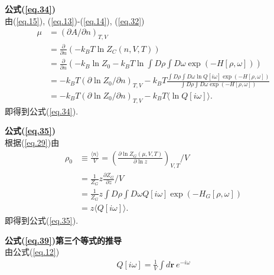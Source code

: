\textbf{公式(\ref{eq.34})}
\\
由(\ref{eq.15}), (\ref{eq.13})-(\ref{eq.14}), (\ref{eq.32})
 \begin{equation}
       \begin{aligned}
           \mu&=(\partial A/\partial n)_{T, V}
              \\
              &=\frac{\partial}{\partial n}(-k_{B}T \ln Z_{C}(n, V, T))
              \\
              &=\frac{\partial}{\partial n}(-k_{B}\ln Z_{0}-k_{B}T\ln \int
              D\rho\int D\omega\exp(-H[\rho, \omega]))
              \\
              &=-k_{B}T(\partial\ln Z_{0}/\partial n)_{T,
              V}-k_{B}T\frac{\int D\rho \int D\omega
             \ln Q[i\omega] \exp(-H[\rho,  \omega])}{\int D\rho \int D\omega
              \exp(-H[\rho,  \omega])}
              \\
              &=-k_{B}T(\partial\ln Z_{0}/\partial n)_{T,V}-k_{B}T\langle \ln
              Q[i\omega] \rangle.
       \end{aligned}
       \label{A.18}
    \end{equation}
即得到公式(\ref{eq.34}).
\par
\textbf{公式(\ref{eq.35})}
\\
根据(\ref{eq.29})由
 \begin{equation}
       \begin{aligned}
           \rho_{0}&\equiv  \frac{\langle n \rangle}{V}=\left(\frac{\partial \ln
           Z_{G}(\mu, V, T)}{\partial \ln z}\right)_{V, T}/V
           \\
           &=\frac{1}{Z_{G}} z \frac{\partial Z_{G}}{\partial z}/V
           \\
           &=\frac{1}{Z_{G}} z \int D\rho \int D\omega
           Q[i\omega]\exp(-H_{G}[\rho, \omega])
           \\
           &=z\langle Q[i\omega] \rangle.
    \end{aligned}
       \label{A.19}
    \end{equation}
即得到公式(\ref{eq.35}).
\par
\textbf{公式(\ref{eq.39})第三个等式的推导}
\\
由公式(\ref{eq.12})
 \begin{equation}
       \begin{aligned}
         Q[i\omega]=\frac{1}{V}\int d\bm{r}\ e^{-i\omega}
       \end{aligned}
       \label{A.19}
    \end{equation}

